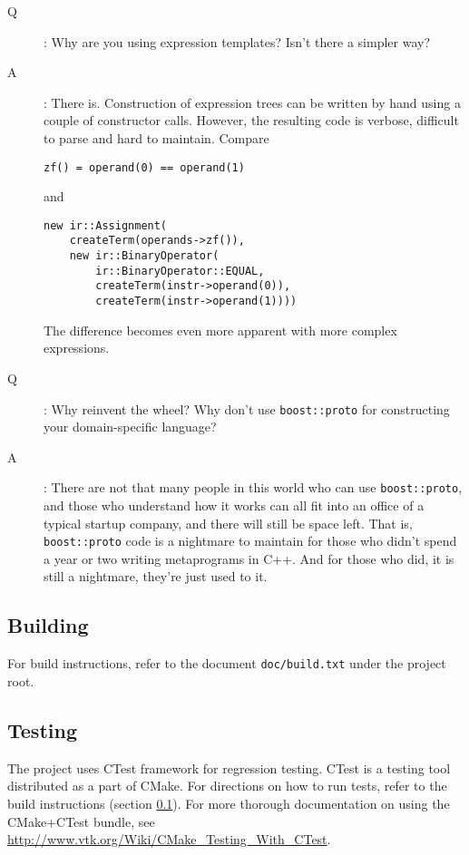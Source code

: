 \documentclass[a4paper,12pt]{article}
\newcommand{\ident}[1]{\texttt{#1}}
\begin{document}
\begin{description}
\item[Q]: Why are you using expression templates? Isn't there a simpler way? 
\item[A]: There is. Construction of expression trees can be written by hand using a couple of constructor calls. However, the resulting code is verbose, difficult to parse and hard to maintain.
Compare 
\begin{verbatim}
zf() = operand(0) == operand(1)
\end{verbatim}
and
\begin{verbatim}
new ir::Assignment(
    createTerm(operands->zf()),
    new ir::BinaryOperator(
        ir::BinaryOperator::EQUAL,
        createTerm(instr->operand(0)),
        createTerm(instr->operand(1))))
\end{verbatim}
The difference becomes even more apparent with more complex expressions.

\item[Q]: Why reinvent the wheel? Why don't use \ident{boost::proto} for constructing your domain-specific language? 
\item[A]: There are not that many people in this world who can use \ident{boost::proto}, and those who understand how it works can all fit into an office of a typical startup company, and there will still be space left. 
That is, \ident{boost::proto} code is a nightmare to maintain for those who didn't spend a year or two writing metaprograms in C++. And for those who did, it is still a nightmare, they're just used to it.
\end{description}

\subsection{Building}
\label{section:intro:building}

For build instructions, refer to the document \verb|doc/build.txt| under the project root.

\subsection{Testing}

The project uses CTest framework for regression testing.
CTest is a testing tool distributed as a part of CMake.
For directions on how to run tests, refer to the build instructions (section \ref{section:intro:building}).
For more thorough documentation on using the CMake+CTest bundle, see \url{http://www.vtk.org/Wiki/CMake_Testing_With_CTest}.
\end{document}
